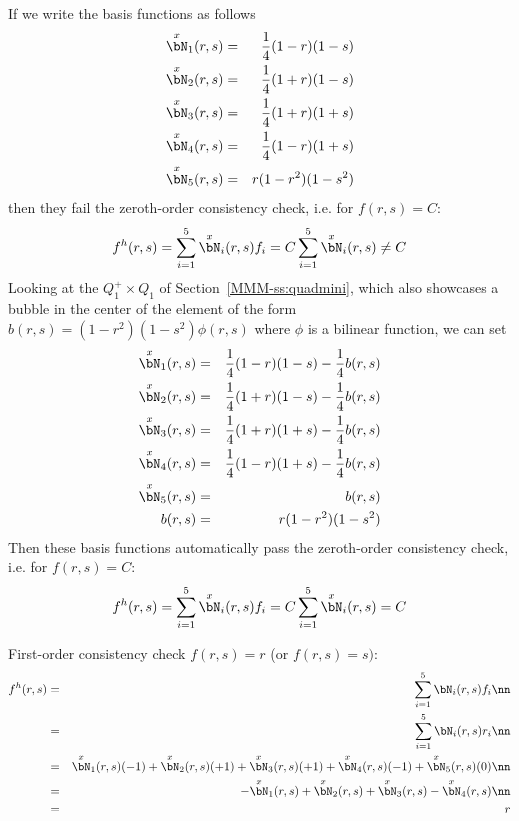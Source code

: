 If we write the basis functions as follows
\begin{eqnarray}
\overset{x}{\bN}_1(r,s) &=& \frac14(1-r)(1-s)  \\
\overset{x}{\bN}_2(r,s) &=& \frac14(1+r)(1-s)  \\
\overset{x}{\bN}_3(r,s) &=& \frac14(1+r)(1+s)  \\
\overset{x}{\bN}_4(r,s) &=& \frac14(1-r)(1+s)  \\
\overset{x}{\bN}_5(r,s) &=& r(1-r^2)(1-s^2)
\end{eqnarray}
then they fail the zeroth-order consistency check, i.e. for $f(r,s)=C$:
\begin{equation}
f^h(r,s) 
= \sum_{i=1}^5 \overset{x}{\bN}_i(r,s) f_i \\
= C \sum_{i=1}^5 \overset{x}{\bN}_i(r,s)  \\
\neq  C
\end{equation}
Looking at the $Q_1^+\times Q_1$ of Section~\ref{MMM-ss:quadmini}, which also 
showcases a bubble in the center of the element of the form 
$b(r, s) = (1- r^2 )(1 -s^2 ) \phi(r,s)$ where $\phi$ is a bilinear function,
we can set
\begin{eqnarray}
\overset{x}{\bN}_1(r,s) &=& \frac14(1-r)(1-s) -\frac14 b(r,s) \\
\overset{x}{\bN}_2(r,s) &=& \frac14(1+r)(1-s) -\frac14 b(r,s)  \\
\overset{x}{\bN}_3(r,s) &=& \frac14(1+r)(1+s) -\frac14 b(r,s)  \\
\overset{x}{\bN}_4(r,s) &=& \frac14(1-r)(1+s) -\frac14 b(r,s)  \\
\overset{x}{\bN}_5(r,s) &=&  b(r,s) \\
b(r,s) &=& r(1-r^2)(1-s^2)
\end{eqnarray}
Then these basis functions automatically pass the zeroth-order consistency check, i.e. for $f(r,s)=C$:
\begin{equation}
f^h(r,s) 
= \sum_{i=1}^5 \overset{x}{\bN}_i(r,s) f_i \\
= C \sum_{i=1}^5 \overset{x}{\bN}_i(r,s)  \\
=  C
\end{equation}

First-order consistency check $f(r,s)=r$ (or $f(r,s)=s)$:
\begin{eqnarray}
f^h(r,s) 
&=& \sum_{i=1}^5 \bN_i(r,s) f_i \nn\\
&=& \sum_{i=1}^5 \bN_i(r,s) r_i \nn\\
&=& \overset{x}{\bN}_1(r,s) (-1) + \overset{x}{\bN}_2(r,s) (+1) + \overset{x}{\bN}_3(r,s) (+1) + \overset{x}{\bN}_4(r,s) (-1) + \overset{x}{\bN}_5(r,s) (0) \nn\\
&=& -\overset{x}{\bN}_1(r,s)+\overset{x}{\bN}_2(r,s)+\overset{x}{\bN}_3(r,s)-\overset{x}{\bN}_4(r,s) \nn\\
&=& r
\end{eqnarray}


